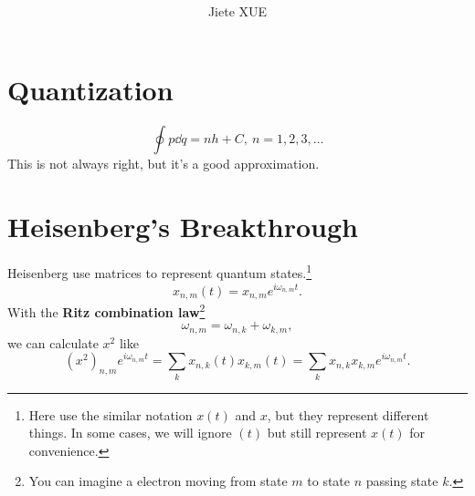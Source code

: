\documentclass{article}
\title{\textbf{\mytitle}}
\author{Jiete XUE}
\date{\mydate}
\theoremstyle{1}
\begin{document}
\maketitle
\thispagestyle{empty}
\newpage
{}
\setcounter{page}{1}
\tableofcontents
\newpage
{}
\setcounter{page}{1}





\section{Quantization}
\begin{equation}\label{eq 1.1}
    \oint p\dd{q}=n h +C,\ n=1,2,3,\dots 
\end{equation}
This is not always right, but it's a good approximation. 
\section{Heisenberg's Breakthrough}
Heisenberg use matrices to represent quantum states.\footnote{Here use the similar notation $x(t)$ and $x$, but they represent different things. In some cases, we will ignore $(t)$ but still represent $x(t)$ for convenience.}
\begin{equation}
    x_{n,m}(t)=x_{n,m}e^{i\omega_{n,m}t}.
\end{equation}
With the \textbf{Ritz combination law}\footnote{You can imagine a electron moving from state $m$ to state $n$ passing state $k$.}
\begin{equation}
    \omega_{n,m}=\omega_{n,k}+\omega_{k,m},
\end{equation}
we can calculate $x^2$ like
\begin{equation}
    \left(x^2\right)_{n,m}e^{i\omega_{n,m}t}=\sum_{k}x_{n,k}(t)x_{k,m}(t)=\sum_{k}x_{n,k}x_{k,m}e^{i\omega_{n,m}t}.
\end{equation}
\end{document}

